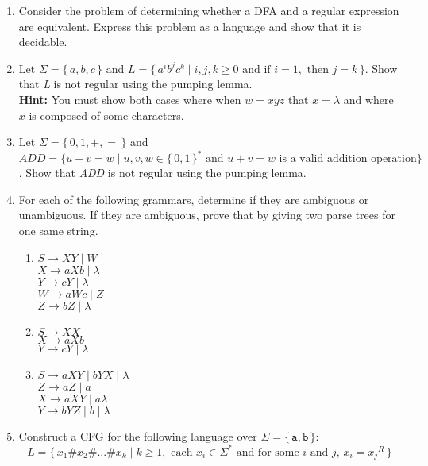 \documentclass[11pt, article, oneside]{memoir}
\newcommand{\set}[1]{\{\, #1\, \}}
\begin{document}
\begin{enumerate}
    \item
    Consider the problem of determining whether a DFA and a regular expression are
equivalent. Express this problem as a language and show that it is decidable.
    
    \item
        Let \(\Sigma = \set{a, b, c}\) and \(L = \set{ {a^i}{b^j}{c^k} \mid i, j, k \ge 0 \text{ and if } i = 1,  \text{ then } j = k}\). Show that \textit{L} is not regular using the pumping lemma.
        \\\textbf{Hint:} You must show both cases where when \(w = xyz\) that \(x = \lambda\) and where \(x\) is composed of some characters.
    \item 
        Let \(\Sigma = \set{0, 1, +, =}\) and \(ADD = \{ u+v=w \mid u, v, w \in \set{0, 1}^* \text{ and } u+v=w \text{ is a valid addition operation}\}\). Show that \textit{ADD} is not regular using the pumping lemma.
    \item
        For each of the following grammars, determine if they are ambiguous or unambiguous. If they are ambiguous, prove that by giving two parse trees for one same string.
        \begin{enumerate}
            \item
                \(S \rightarrow XY \mid W \)
                \\\(X \rightarrow aXb \mid \lambda\)
                \\\(Y \rightarrow cY \mid \lambda\)
                \\\(W \rightarrow aWc \mid Z\)
                \\\(Z \rightarrow bZ \mid \lambda\)
            \item
                \(S \rightarrow XX \)
                \\\(X \rightarrow aXb\)
                \\\(Y \rightarrow cY \mid \lambda\)
            \item
                \(S \rightarrow aXY \mid bYX \mid \lambda \)
                \\\(Z \rightarrow aZ \mid a\)
                \\\(X \rightarrow aXY \mid a \lambda\)
                \\\(Y \rightarrow bYZ \mid b \mid \lambda\) 
        \end{enumerate}
    \item
        Construct a CFG for the following language over \(\Sigma = \set{\texttt{a}, \texttt{b}}\):
        \[
            L = \set{x_1\#x_2\#...\#x_k \mid k \ge 1, \text{ each } x_i \in \Sigma^* \text{ and for some } i \text{ and } j \text{, } x_i = {x_j}^R}
        \]    
\end{enumerate}
\end{document}
